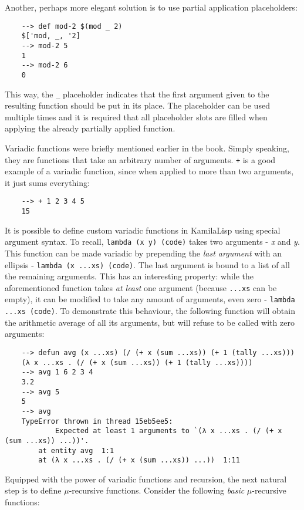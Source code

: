 Another, perhaps more elegant solution is to use partial application placeholders:

\begin{Verbatim}
    --> def mod-2 $(mod _ 2)
    $['mod, _, '2]
    --> mod-2 5
    1
    --> mod-2 6
    0
\end{Verbatim}

This way, the \verb|_| placeholder indicates that the first argument given to the resulting function should be put in its place. The placeholder can be used multiple times and it is required that all placeholder slots are filled when applying the already partially applied function.

Variadic functions were briefly mentioned earlier in the book. Simply speaking, they are functions that take an arbitrary number of arguments. \verb|+| is a good example of a variadic function, since when applied to more than two arguments, it just sums everything:

\begin{Verbatim}
    --> + 1 2 3 4 5
    15
\end{Verbatim}

It is possible to define custom variadic functions in KamilaLisp using special argument syntax. To recall, \verb|lambda (x y) (code)| takes two arguments - \textit{x} and \textit{y}. This function can be made variadic by prepending the \textit{last argument} with an ellipsis - \verb|lambda (x ...xs) (code)|. The last argument is bound to a list of all the remaining arguments. This has an interesting property: while the aforementioned function takes \textit{at least} one argument (because \verb|...xs| can be empty), it can be modified to take any amount of arguments, even zero - \verb|lambda ...xs (code)|. To demonstrate this behaviour, the following function will obtain the arithmetic average of all its arguments, but will refuse to be called with zero arguments:

\begin{Verbatim}
    --> defun avg (x ...xs) (/ (+ x (sum ...xs)) (+ 1 (tally ...xs)))
    (λ x ...xs . (/ (+ x (sum ...xs)) (+ 1 (tally ...xs))))
    --> avg 1 6 2 3 4
    3.2
    --> avg 5
    5
    --> avg
    TypeError thrown in thread 15eb5ee5:
            Expected at least 1 arguments to `(λ x ...xs . (/ (+ x (sum ...xs)) ...))'.
        at entity avg  1:1
        at (λ x ...xs . (/ (+ x (sum ...xs)) ...))  1:11
\end{Verbatim}

Equipped with the power of variadic functions and recursion, the next natural step is to define $\mu$-recursive functions. Consider the following \textit{basic} $\mu$-recursive functions:

